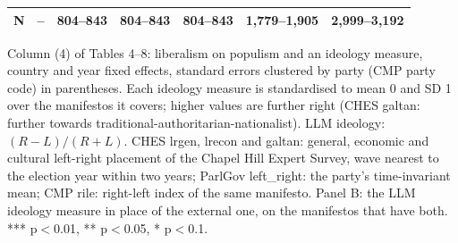 \begin{table}[ht]
{\begin{tabular}{lrrrrrr}
N & -- & 804--843 & 804--843 & 804--843 & 1,779--1,905 & 2,999--3,192 \\
\bottomrule
\end{tabular}}
\par\smallskip
\begin{minipage}{\linewidth}\scriptsize Column (4) of Tables 4--8: liberalism on populism and an ideology measure, country and year fixed effects, standard errors clustered by party (CMP party code) in parentheses. Each ideology measure is standardised to mean 0 and SD 1 over the manifestos it covers; higher values are further right (CHES galtan: further towards traditional-authoritarian-nationalist). LLM ideology: $(R-L)/(R+L)$. CHES lrgen, lrecon and galtan: general, economic and cultural left-right placement of the Chapel Hill Expert Survey, wave nearest to the election year within two years; ParlGov left\_right: the party's time-invariant mean; CMP rile: right-left index of the same manifesto. Panel B: the LLM ideology measure in place of the external one, on the manifestos that have both. *** p$<$0.01, ** p$<$0.05, * p$<$0.1.\end{minipage}
\end{table}
